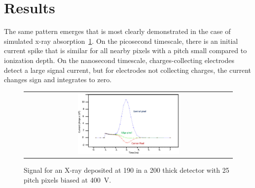 \section{Results}
The same pattern emerges that is most clearly demonstrated in the case of simulated x-ray absorption~\ref{Signal_xray}.
On the picosecond timescale, there is an initial current spike that is similar for all nearby pixels with a pitch small compared to ionization depth.
On the nanosecond timescale, charges-collecting electrodes detect a large signal current, but for electrodes not collecting charges, the current changes sign and integrates to zero.
\begin{figure}[htb]
  \begin{center}
    \begin{tabular}{c}
      \includegraphics[width=0.50\textwidth]{fig_FastTiming/Signal_xray.png}
    \end{tabular}
    \caption{Signal for an X-ray deposited at \SI{190}{\micron} in a \SI{200}{\micron} thick detector with \SI{25}{\micron} pitch pixels biased at \SI{400}{\V}.
            }
    \label{Signal_xray}
  \end{center}
\end{figure}

